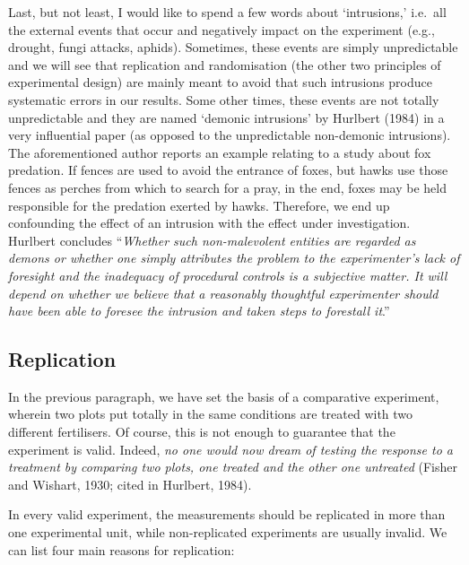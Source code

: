 \documentclass[a4paper,12pt,oneside]{book}
\begin{document}
Last, but not least, I would like to spend a few words about `intrusions,' i.e.~all the external events that occur and negatively impact on the experiment (e.g., drought, fungi attacks, aphids). Sometimes, these events are simply unpredictable and we will see that replication and randomisation (the other two principles of experimental design) are mainly meant to avoid that such intrusions produce systematic errors in our results. Some other times, these events are not totally unpredictable and they are named `demonic intrusions' by Hurlbert (1984) in a very influential paper (as opposed to the unpredictable non-demonic intrusions). The aforementioned author reports an example relating to a study about fox predation. If fences are used to avoid the entrance of foxes, but hawks use those fences as perches from which to search for a pray, in the end, foxes may be held responsible for the predation exerted by hawks. Therefore, we end up confounding the effect of an intrusion with the effect under investigation. Hurlbert concludes ``\emph{Whether such non-malevolent entities are regarded as demons or whether one simply attributes the problem to the experimenter's lack of foresight and the inadequacy of procedural controls is a subjective matter. It will depend on whether we believe that a reasonably thoughtful experimenter should have been able to foresee the intrusion and taken steps to forestall it}.''

\hypertarget{replication}{%
\subsection{Replication}\label{replication}}

In the previous paragraph, we have set the basis of a comparative experiment, wherein two plots put totally in the same conditions are treated with two different fertilisers. Of course, this is not enough to guarantee that the experiment is valid. Indeed, \emph{no one would now dream of testing the response to a treatment by comparing two plots, one treated and the other one untreated} (Fisher and Wishart, 1930; cited in Hurlbert, 1984).

In every valid experiment, the measurements should be replicated in more than one experimental unit, while non-replicated experiments are usually invalid. We can list four main reasons for replication:
\end{document}
